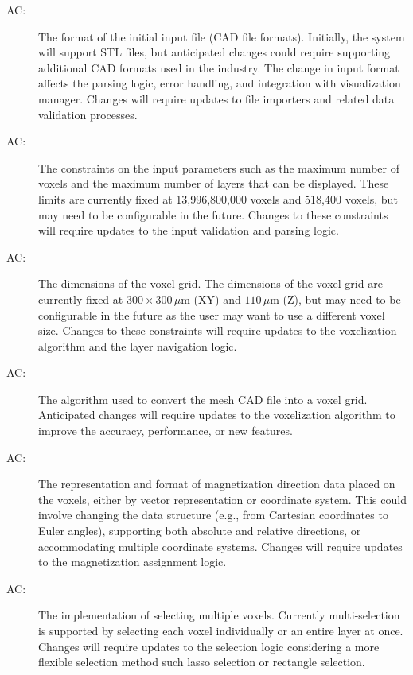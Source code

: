 \documentclass[12pt, titlepage]{article}
\newcounter{acnum}
\newcommand{\actheacnum}{AC\theacnum}
\begin{document}
\begin{description}
\item[ \actheacnum\label{acInput}:] The format of the initial input file (CAD file formats). Initially, the system will support STL files, but anticipated changes could require supporting additional CAD formats used in the industry. The change in input format affects the parsing logic, error handling, and integration with visualization manager. Changes will require updates to file importers and related data validation processes.

\item[ \actheacnum\label{acInputConstraints}:] The constraints on the input parameters such as the maximum number of voxels and the maximum number of layers that can be displayed. These limits are currently fixed at 13,996,800,000 voxels and 518,400 voxels, but may need to be configurable in the future. Changes to these constraints will require updates to the input validation and parsing logic.

\item[ \actheacnum\label{acVoxelSize}:] The dimensions of the voxel grid. The dimensions of the voxel grid are currently fixed at $300 \times 300\,\mu\mathrm{m}$ (XY) and $110\,\mu\mathrm{m}$ (Z), but may need to be configurable in the future as the user may want to use a different voxel size. Changes to these constraints will require updates to the voxelization algorithm and the layer navigation logic.

\item[ \actheacnum\label{acVoxelization}:] The algorithm used to convert the mesh CAD file into a voxel grid. Anticipated changes will require updates to the voxelization algorithm to improve the accuracy, performance, or new features. 

\item[ \actheacnum\label{acMagnetization}:] The representation and format of magnetization direction data placed on the voxels, either by vector representation or coordinate system. This could involve changing the data structure (e.g., from Cartesian coordinates to Euler angles), supporting both absolute and relative directions, or accommodating multiple coordinate systems. Changes will require updates to the magnetization assignment logic.

\item[ \actheacnum\label{acSelection}:] The implementation of selecting multiple voxels. Currently multi-selection is supported by selecting each voxel individually or an entire layer at once. Changes will require updates to the selection logic considering a more flexible selection method such lasso selection or rectangle selection.


\end{description}
\end{document}
